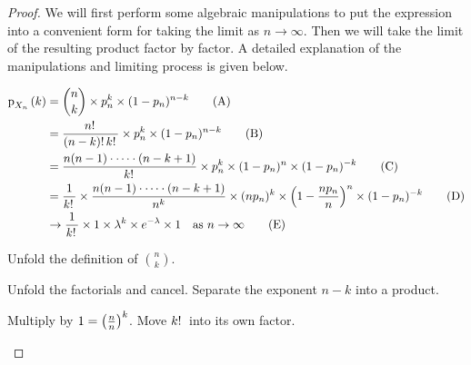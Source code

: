 \documentclass[11pt]{article}
\begin{document}
\begin{proof}
    We will first perform some algebraic manipulations to put the expression
    into a convenient form for taking the limit as $n \to \infty$.
    Then we will take the limit of the resulting product factor by factor.
    A detailed explanation of the manipulations and limiting process is given
    below.

    \begin{align*}
        \p[X_n]{k}
        &= \binom{n}{k}
            \times
            p_n^k
            \times
            (1 - p_n)^{n - k}
            \tag{A} \label{eq:poisson-step-1} \\
        &= \frac{n\fact}{(n-k)\fact k\fact}
            \times
            p_n^k
            \times
            (1 - p_n)^{n - k}
            \tag{B} \label{eq:poisson-step-2} \\
        &= \frac{n(n-1) \cdot\cdots\cdot (n-k+1)}{k\fact}
            \times
            p_n^k
            \times
            (1 - p_n)^n
            \times
            (1 - p_n)^{-k}
            \tag{C} \label{eq:poisson-step-3} \\
        &= \frac{1}{k\fact}
            \times
            \frac{n(n-1) \cdot\cdots\cdot (n-k+1)}{n^k}
            \times
            (n p_n)^k
            \times
            \parens{1 - \frac{n p_n}{n}}^n
            \times
            (1 - p_n)^{-k}
            \tag{D} \label{eq:poisson-step-4} \\
        &\to \frac{1}{k\fact}
            \times
            1
            \times
            \lambda^k
            \times
            e^{-\lambda}
            \times
            1
            \quad
            \text{as $n \to \infty$}
            \tag{E} \label{eq:poisson-step-5}
    \end{align*}
    \begin{description}
            \newcommand{\stepAB}[2]{%
                \eqref{eq:poisson-step-#1}%
                \textrightarrow%
                \eqref{eq:poisson-step-#2}%
                .
            }
        \item[\stepAB{1}{2}]
            Unfold the definition of $\binom{n}{k}$.
        \item[\stepAB{2}{3}]
            Unfold the factorials and cancel.
            Separate the exponent $n-k$ into a product.
        \item[\stepAB{3}{4}]
            Multiply by $1 = \left(\frac{n}{n}\right)^k$.
            Move $k!\,$ into its own factor.

\end{description}
\end{proof}
\end{document}
